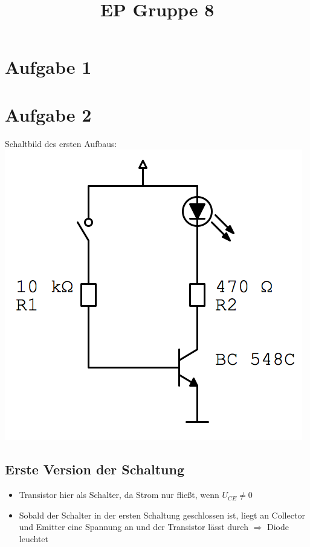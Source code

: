 \documentclass[compress,11pt]{beamer}
\title{EP Gruppe 8}
\begin{document}
\section{Aufgabe 1}
\begin{frame}

\end{frame}


\section{Aufgabe 2}
\begin{frame}Schaltbild des ersten Aufbaus:\\
\includegraphics[width=.7\textwidth]{schaltbilder/2}\\
\end{frame}
\begin{frame}

\subsection{Erste Version der Schaltung}
\begin{itemize}
\item Transistor hier als Schalter, da Strom nur fließt, wenn $U_{CE} \neq 0$
\item Sobald der Schalter in der ersten Schaltung geschlossen ist, liegt an Collector und Emitter eine Spannung an und der Transistor lässt durch $\Rightarrow$ Diode leuchtet
\end{itemize}

\end{frame}
\end{document}
